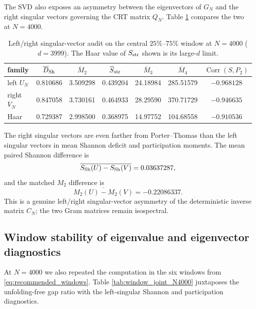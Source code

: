 \documentclass[11pt]{amsart}
\numberwithin{equation}{section}
\theoremstyle{plain}
\theoremstyle{definition}
\theoremstyle{remark}
\begin{document}
The SVD also exposes an asymmetry between the eigenvectors of $G_N$ and the right singular vectors governing the CRT matrix $Q_N$.  Table \ref{tab:left_right_N4000} compares the two at $N=4000$.

\begin{table}[htbp]
\centering
\caption{Left/right singular-vector audit on the central $25\%$--$75\%$ window at $N=4000$ ($d=3999$).  The Haar value of $S_{\rm str}$ shown is its large-$d$ limit.}
\label{tab:left_right_N4000}
\begin{tabular}{lcccccc}
\toprule
family & $\overline D_{\rm Sh}$ & $\overline M_2$ & $\overline S_{\rm str}$ & $\overline M_3$ & $\overline M_4$ & $\operatorname{Corr}(S,P_2)$\\
\midrule
left $U_N$  & 0.810686 & 3.509298 & 0.439204 & 24.18984 & 285.51579 & $-0.968128$\\
right $V_N$ & 0.847058 & 3.730161 & 0.464933 & 28.29590 & 370.71729 & $-0.946635$\\
Haar        & 0.729387 & 2.998500 & 0.368975 & 14.97752 & 104.68558 & $-0.910536$\\
\bottomrule
\end{tabular}
\end{table}

The right singular vectors are even farther from Porter--Thomas than the left singular vectors in mean Shannon deficit and participation moments.  The mean paired Shannon difference is
\begin{equation}
\overline{S_{\rm Sh}(U)-S_{\rm Sh}(V)}=0.03637287,
\label{eq:left_right_shannon_difference}
\end{equation}
and the matched $M_2$ difference is
\begin{equation}
\overline{M_2(U)-M_2(V)}=-0.22086337.
\label{eq:left_right_M2_difference}
\end{equation}
This is a genuine left/right singular-vector asymmetry of the deterministic inverse matrix $C_N$; the two Gram matrices remain isospectral.

\subsection{Window stability of eigenvalue and eigenvector diagnostics}
\label{subsec:shannon_window_stability}

At $N=4000$ we also repeated the computation in the six windows from \eqref{eq:recommended_windows}.  Table \ref{tab:window_joint_N4000} juxtaposes the unfolding-free gap ratio with the left-singular Shannon and participation diagnostics.
\end{document}
